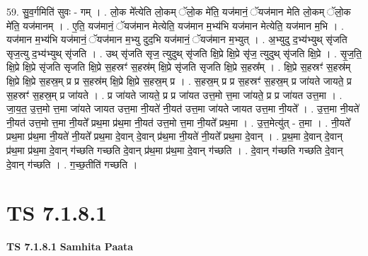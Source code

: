 \documentclass[17pt]{extarticle}
\begin{document}
59. सु॒व॒र्गमिति॑ सुवः - गम् । . लो॒क मे᳚त्येति लो॒कम् ॅलो॒क मे॑ति॒ यज॑मानं॒ ॅयज॑मान मेति लो॒कम् ॅलो॒क मे॑ति॒ यज॑मानम् । . ए॒ति॒ यज॑मानं॒ ॅयज॑मान मेत्येति॒ यज॑मान म॒भ्य॑भि यज॑मान मेत्येति॒ यज॑मान म॒भि । . यज॑मान म॒भ्य॑भि यज॑मानं॒ ॅयज॑मान म॒भ्यु दुद॒भि यज॑मानं॒ ॅयज॑मान म॒भ्युत् । . अ॒भ्युदु द॒भ्य॑भ्युथ् सृ॑जति सृज॒त्यु द॒भ्य॑भ्युथ् सृ॑जति । . उथ् सृ॑जति सृज॒ त्युदुथ् सृ॑जति क्षि॒प्रे क्षि॒प्रे सृ॑ज॒ त्युदुथ् सृ॑जति क्षि॒प्रे । . सृ॒ज॒ति॒ क्षि॒प्रे क्षि॒प्रे सृ॑जति सृजति क्षि॒प्रे स॒हस्रꣳ॑ स॒हस्र॑म् क्षि॒प्रे सृ॑जति सृजति क्षि॒प्रे स॒हस्र᳚म् । . क्षि॒प्रे स॒हस्रꣳ॑ स॒हस्र॑म् क्षि॒प्रे क्षि॒प्रे स॒हस्र॒म् प्र प्र स॒हस्र॑म् क्षि॒प्रे क्षि॒प्रे स॒हस्र॒म् प्र । . स॒हस्र॒म् प्र प्र स॒हस्रꣳ॑ स॒हस्र॒म् प्र जा॑यते जायते॒ प्र स॒हस्रꣳ॑ स॒हस्र॒म् प्र जा॑यते । . प्र जा॑यते जायते॒ प्र प्र जा॑यत उत्त॒मो त्त॒मा जा॑यते॒ प्र प्र जा॑यत उत्त॒मा । . जा॒य॒त॒ उ॒त्त॒मो त्त॒मा जा॑यते जायत उत्त॒मा नी॒यते॑ नी॒यत॑ उत्त॒मा जा॑यते जायत उत्त॒मा नी॒यते᳚ । . उ॒त्त॒मा नी॒यते॑ नी॒यत॑ उत्त॒मो त्त॒मा नी॒यते᳚ प्रथ॒मा प्र॑थ॒मा नी॒यत॑ उत्त॒मो त्त॒मा नी॒यते᳚ प्रथ॒मा । . उ॒त्त॒मेत्यु॑त् - त॒मा । . नी॒यते᳚ प्रथ॒मा प्र॑थ॒मा नी॒यते॑ नी॒यते᳚ प्रथ॒मा दे॒वान् दे॒वान् प्र॑थ॒मा नी॒यते॑ नी॒यते᳚ प्रथ॒मा दे॒वान् । . प्र॒थ॒मा दे॒वान् दे॒वान् प्र॑थ॒मा प्र॑थ॒मा दे॒वान् ग॑च्छति गच्छति दे॒वान् प्र॑थ॒मा प्र॑थ॒मा दे॒वान् ग॑च्छति । . दे॒वान् ग॑च्छति गच्छति दे॒वान् दे॒वान् ग॑च्छति । . ग॒च्छ॒तीति॑ गच्छति । \newline
\pagebreak
{}

\section{ TS 7.1.8.1 }

\textbf{TS 7.1.8.1 } \newline
\textbf{Samhita Paata} \newline
\end{document}

